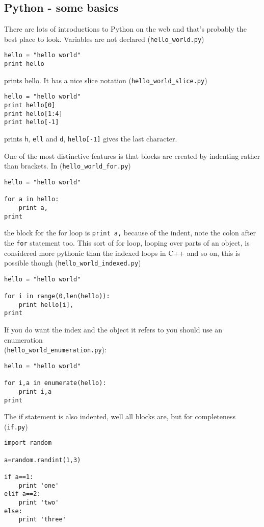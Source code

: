 \documentclass[11pt,a4paper]{scrartcl}
\begin{document}
\subsection*{Python - some basics}
There are lots of introductions to Python on the web and that's
probably the best place to look. Variables are not declared (\texttt{hello\_world.py})
\begin{lstlisting}[numbers=right]
hello = "hello world"
print hello
\end{lstlisting}
prints hello. It has a nice slice notation  (\texttt{hello\_world\_slice.py})
\begin{lstlisting}[numbers=right]
hello = "hello world"
print hello[0]
print hello[1:4]
print hello[-1]
\end{lstlisting}
prints \texttt{h}, \texttt{ell} and \texttt{d}, \texttt{hello[-1]}
gives the last character. 

One of the most distinctive features is that blocks are created by
indenting rather than brackets. In  (\texttt{hello\_world\_for.py})
\begin{lstlisting}[numbers=right]
hello = "hello world"

for a in hello:
    print a,
print 
\end{lstlisting}
the block for the for loop is \texttt{print a,} because of the indent,
note the colon after the \texttt{for} statement too. This sort of for
loop, looping over parts of an object, is considered more pythonic
than the indexed loops in C++ and so on, this is possible though  (\texttt{hello\_world\_indexed.py})
\begin{lstlisting}[numbers=right]
hello = "hello world"

for i in range(0,len(hello)):
    print hello[i],
print 
\end{lstlisting}
If you do want the index and the object it refers to you should use an
enumeration\\(\texttt{hello\_world\_enumeration.py}):
\begin{lstlisting}[numbers=right]
hello = "hello world"

for i,a in enumerate(hello):
    print i,a
print 
\end{lstlisting}
The if statement is also indented, well all blocks are, but for completeness  (\texttt{if.py})
\begin{lstlisting}[numbers=right]
import random

a=random.randint(1,3)

if a==1:
    print 'one'
elif a==2:
    print 'two'
else:
    print 'three'
\end{lstlisting}
\end{document}
